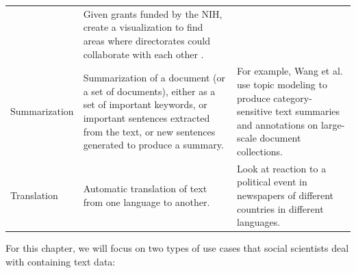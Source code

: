\documentclass[]{krantz}
\begin{document}
\begin{longtable}[]{@{}lll@{}}
\begin{minipage}[t]{0.16\columnwidth}
\end{minipage} & \begin{minipage}[t]{0.63\columnwidth}\raggedright\strut
Given grants funded by the NIH, create a visualization to find areas
where directorates could collaborate with each other
\citep{EdmundMTalley2011}.\strut
\end{minipage}\tabularnewline
\begin{minipage}[t]{0.12\columnwidth}\raggedright\strut
Summarization\strut
\end{minipage} & \begin{minipage}[t]{0.16\columnwidth}\raggedright\strut
Summarization of a document (or a set of documents), either as a set of
important keywords, or important sentences extracted from the text, or
new sentences generated to produce a summary.\strut
\end{minipage} & \begin{minipage}[t]{0.63\columnwidth}\raggedright\strut
For example, Wang et al. \citeyearpar{wang-09} use topic modeling to
produce category-sensitive text summaries and annotations on large-scale
document collections.\strut
\end{minipage}\tabularnewline
\begin{minipage}[t]{0.12\columnwidth}\raggedright\strut
Translation\strut
\end{minipage} & \begin{minipage}[t]{0.16\columnwidth}\raggedright\strut
Automatic translation of text from one language to another.\strut
\end{minipage} & \begin{minipage}[t]{0.63\columnwidth}\raggedright\strut
Look at reaction to a political event in newspapers of different
countries in different languages.\strut
\end{minipage}\tabularnewline
\bottomrule
\end{longtable}

For this chapter, we will focus on two types of use cases that social
scientists deal with containing text data:
\end{document}
